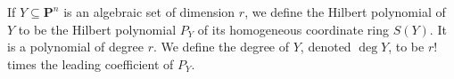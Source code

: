 If $Y \subseteq \mathbf{P}^n$ is an algebraic set of dimension $r$, we define the Hilbert polynomial of $Y$ to be the Hilbert polynomial $P_Y$ of its homogeneous coordinate ring $S(Y)$. It is a polynomial of degree $r$. We define the degree of $Y$, denoted $\deg Y$, to be $r!$ times the leading coefficient of $P_Y$.
